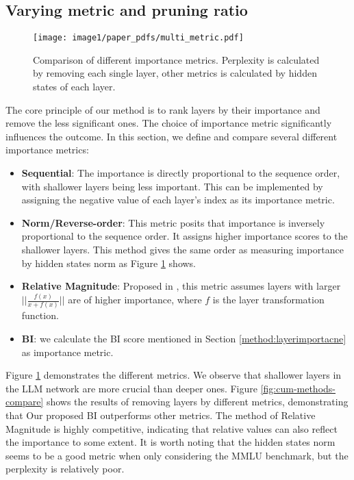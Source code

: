 		\subsection{Varying  metric and pruning ratio} \label{ana:layerimportance}
		\begin{figure}[h]
			\centering
			\texttt{[image: image1/paper\_pdfs/multi\_metric.pdf]}
			\caption{\label{fig:importance-comp}Comparison of different importance metrics. Perplexity is calculated by removing each single layer, other metrics is calculated by hidden states of each layer.}
		\end{figure}
		The core principle of our method is to rank layers by their importance and remove the less significant ones. The choice of importance metric significantly influences the outcome. In this section, we define and compare several different importance metrics:
		\begin{itemize}
			\item \textbf{Sequential}: The importance is directly proportional to the sequence order, with shallower layers being less important. This can be implemented by  assigning the negative value of each layer's index as its importance metric.
			
			\item \textbf{Norm/Reverse-order}: This metric posits that importance is inversely proportional to the sequence order. It assigns higher importance scores to the shallower layers. This method gives the same order as measuring importance by hidden states norm as Figure \ref{fig:importance-comp} shows.
			
			\item \textbf{Relative Magnitude}: Proposed in \cite{samragh2023weight}, this metric assumes layers with larger $ ||\frac{f(x)}{x+f(x)}||$ are of higher importance, where $f$ is the layer transformation function.
			
			\item \textbf{BI}: we calculate the BI score mentioned in Section \ref{method:layerimportacne} as importance metric.
		\end{itemize}
		
		
		
		
		Figure \ref{fig:importance-comp} demonstrates the different metrics. We observe that shallower layers in the LLM network are more crucial than deeper ones. Figure \ref{fig:cum-methods-compare} shows the results of removing layers by different metrics, demonstrating that Our proposed BI outperforms other metrics. The method of Relative Magnitude is highly competitive, indicating that relative values can also reflect the importance to some extent. It is worth noting that the hidden states norm seems to be a good metric when only considering the MMLU benchmark, but the perplexity is relatively poor. 
		

